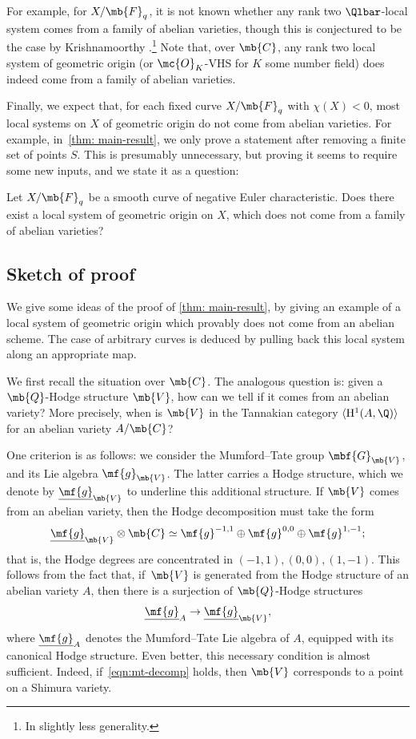 For example, for $X/\mb{F}_q$, it is not known whether any rank two $\Qlbar$-local system comes from a family of abelian varieties, though this is conjectured to be the case by Krishnamoorthy \cite[Conj.\,1.2]{Krishnamoorthy-Rank-2-Local-Systems-and-Barsotti-Tate-Groups}.\footnote{In slightly less generality.} Note that, over $\mb{C}$, any rank two local system of geometric origin (or $\mc{O}_K$-VHS for $K$ some number field) does indeed come from a family of abelian varieties.

Finally, we expect that, for each fixed curve $X/\mb{F}_q$ with $\chi(X)<0$, most local systems on $X$ of geometric origin do not come from abelian varieties. For example, in~\cref{thm: main-result}, we only prove a statement after removing a finite set of points $S$. This is presumably unnecessary, but proving it seems to require some new inputs, and we state it as a question:

\begin{question}
Let $X/\mb{F}_q$ be a smooth curve of negative Euler characteristic. Does there exist a local system of geometric origin on $X$, which does not come from a family of abelian varieties?
\end{question}

\subsection{Sketch of proof}
We give some ideas of the proof of \cref{thm: main-result}, by giving an example of a local system of geometric origin which provably does not come from an abelian scheme. The case of arbitrary curves is deduced by pulling back this local system along an appropriate map.

We first recall the situation over $\mb{C}$. The analogous question is: given a $\mb{Q}$-Hodge structure $\mb{V}$, how can we tell if it comes from an abelian variety? More precisely, when is $\mb{V}$ in the Tannakian category $\langle \mathrm{H}^1(A,\Q)\rangle$ for an abelian variety $A/\mb{C}$?

One criterion is as follows: we consider the Mumford--Tate group $\mbf{G}_{\mb{V}}$, and its Lie algebra $\mf{g}_{\mb{V}}$. The latter carries a Hodge structure, which we denote by $\underline{\mf{g}}_{\mb{V}}$ to underline this additional structure. If $\mb{V}$ comes from an abelian variety, then the Hodge decomposition must take the form
\begin{equation}\label{eqn:mt-decomp}
\underline{\mf{g}}_{\mb{V}}\otimes \mb{C}\simeq \mf{g}^{-1,1}\oplus \mf{g}^{0,0}\oplus \mf{g}^{1,-1};
\end{equation}
that is, the Hodge degrees are concentrated in $(-1,1), (0,0), (1,-1)$. This follows from the fact that, if~$\mb{V}$ is generated from the Hodge structure of an abelian variety $A$, then there is a surjection of $\mb{Q}$-Hodge structures
\[
\underline{\mf{g}}_A\rightarrow \underline{\mf{g}}_{\mb{V}},
\]
where $\underline{\mf{g}}_A$ denotes the Mumford--Tate Lie algebra of $A$, equipped with its canonical Hodge structure. Even better, this necessary condition is almost sufficient. Indeed, if~\eqref{eqn:mt-decomp} holds, then $\mb{V}$ corresponds to a point on a Shimura variety.

